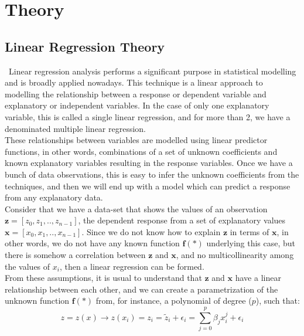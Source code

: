 \section{Theory}
\label{chap:Theory}

\subsection{Linear Regression Theory}
\label{chap:Linear Regression Theory}

\quad \, Linear regression analysis performs a significant purpose in statistical modelling and is broadly applied nowadays. This technique is a linear approach to modelling the relationship between a response or dependent variable and explanatory or independent variables. In the case of only one explanatory variable, this is called a single linear regression, and for more than 2, we have a denominated multiple linear regression.\\

These relationships between variables are modelled using linear predictor functions, in other words, combinations of a set of unknown coefficients and known explanatory variables resulting in the response variables. Once we have a bunch of data observations, this is easy to infer the unknown coefficients from the techniques, and then we will end up with a model which can predict a response from any explanatory data.\\

Consider that we have a data-set that shows the values of an observation $\textbf{z} = [z_0, z_1, .., z_{n-1}]$, the dependent response from a set of explanatory values $\textbf{x} = [x_0, x_1, .., x_{n-1}]$. Since we do not know how to explain $\textbf{z}$ in terms of $\textbf{x}$, in other words, we do not have any known function $\textbf{f}(*)$ underlying this case, but there is somehow a correlation between $\textbf{z}$ and $\textbf{x}$, and no multicollinearity among the values of $x_i$, then a linear regression can be formed.\\

From these assumptions, it is usual to understand that $\textbf{z}$ and $\textbf{x}$ have a linear relationship between each other, and we can create a parametrization of the unknown function $\textbf{f}(*)$ from, for instance, a polynomial of degree ($p$), such that:\\

\begin{equation}
\label{eq1}
z = z(x) \rightarrow z(x_i)=z_i=\tilde{z}_i+\epsilon_i=\sum_{j=0}^{p}\beta_j x_i^j + \epsilon_i
\end{equation}\\

